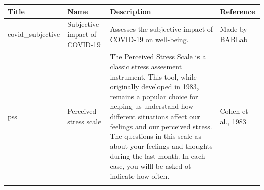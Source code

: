 \documentclass[]{book}
\begin{document}
\begin{longtable}[]{@{}llll@{}}
\toprule
\begin{minipage}[b]{0.22\columnwidth}\raggedright
Title\strut
\end{minipage} & \begin{minipage}[b]{0.27\columnwidth}\raggedright
Name\strut
\end{minipage} & \begin{minipage}[b]{0.22\columnwidth}\raggedright
Description\strut
\end{minipage} & \begin{minipage}[b]{0.18\columnwidth}\raggedright
Reference\strut
\end{minipage}\tabularnewline
\midrule
\endhead
\begin{minipage}[t]{0.22\columnwidth}\raggedright
covid\_subjective\strut
\end{minipage} & \begin{minipage}[t]{0.27\columnwidth}\raggedright
Subjective impact of COVID-19\strut
\end{minipage} & \begin{minipage}[t]{0.22\columnwidth}\raggedright
Assesses the subjective impact of COVID-19 on well-being.\strut
\end{minipage} & \begin{minipage}[t]{0.18\columnwidth}\raggedright
Made by BABLab\strut
\end{minipage}\tabularnewline
\begin{minipage}[t]{0.22\columnwidth}\raggedright
pss\strut
\end{minipage} & \begin{minipage}[t]{0.27\columnwidth}\raggedright
Perceived stress scale\strut
\end{minipage} & \begin{minipage}[t]{0.22\columnwidth}\raggedright
The Perceived Stress Scale is a classic stress assesment instrument. This tool, while originally developed in 1983, remains a popular choice for helping us understand how different situations affect our feelings and our perceived stress. The questions in this scale as about your feelings and thoughts during the last month. In each case, you willl be asked ot indicate how often.\strut
\end{minipage} & \begin{minipage}[t]{0.18\columnwidth}\raggedright
Cohen et al., 1983\strut
\end{minipage}\tabularnewline
\begin{minipage}[t]{0.22\columnwidth}\raggedright

\end{minipage}
\end{longtable}
\end{document}
